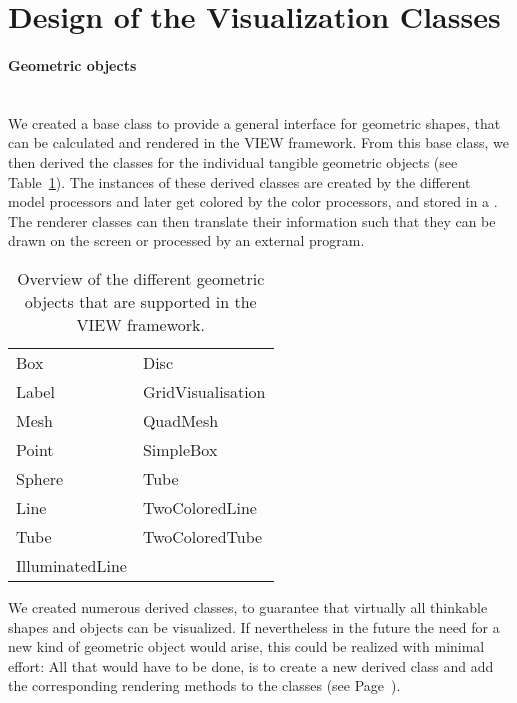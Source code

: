 \section{Design of the Visualization Classes}

\paragraph{Geometric objects}
\hspace*{\fill}\\%
\label{geometric_objects}%
\noindent%
We created a base class  to provide a general interface
for geometric shapes, that can be calculated and rendered in the VIEW
framework. From this base class, we then derived the classes for the individual
tangible geometric objects (see Table~\ref{tab:go}). The instances of these 
derived classes are created by the different model processors and later get 
colored by the color processors, and stored in a . The 
renderer classes can then translate their information such that they can \eg
be drawn on the screen or processed by an external program.

\begin{table} [ht] %
\centering
\begin{tabular} {|l|l|}
\hline
Box             & Disc             \\
Label           & GridVisualisation\\
Mesh            & QuadMesh         \\
Point           & SimpleBox        \\
Sphere          & Tube             \\
Line            & TwoColoredLine   \\
Tube            & TwoColoredTube   \\
IlluminatedLine &                  \\
\hline
\end{tabular}
\caption{Overview of the different geometric objects that are supported in the
VIEW framework.}
\label{tab:go}
\end{table}

We created numerous derived  classes, to guarantee that
virtually all thinkable shapes and objects can be visualized. If nevertheless 
in the future the need for a new kind of geometric object would arise, this 
could be realized with minimal effort: All that would have to be done, is to 
create a new derived  class and add the corresponding 
rendering methods to the  classes (see 
Page~\pageref{renderer}).

